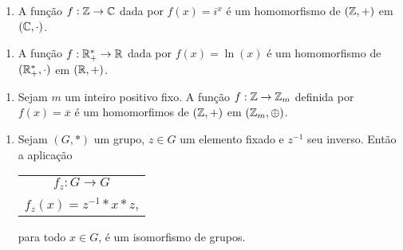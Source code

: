 \documentclass{beamer}
\begin{document}
    \begin{frame}
        \begin{exemplos}
            \begin{enumerate}[label={\arabic*})]
                \item A fun\c{c}\~ao $f : \mathbb{Z} \to \mathbb{C}$ \pause dada por $f(x) = i^x$ \pause \'e um homomorfismo de $(\mathbb{Z}, +)$ \pause em $(\mathbb{C}, \cdot)$.
                \seti
            \end{enumerate}
        \end{exemplos}
    \end{frame}
    \begin{frame}
        \begin{exemplos}
            \begin{enumerate}[label={\arabic*})]
                \conti

                \item A fun\c{c}\~ao $f : \mathbb{R}^*_+ \to \mathbb{R}$ \pause dada por $f(x) = \ln(x)$ \pause \'e um homomorfismo de $(\mathbb{R}^*_+, \cdot)$ \pause em $(\mathbb{R}, +)$.
                \seti
            \end{enumerate}
        \end{exemplos}
    \end{frame}
    \begin{frame}
        \begin{exemplos}
            \begin{enumerate}[label={\arabic*})]
                \conti

                \item Sejam $m$ um inteiro positivo fixo. \pause A fun\c{c}\~ao $f: \mathbb{Z} \to \mathbb{Z}_m$ \pause definida por $f(x) = \overline{x}$ \pause \'e um homomorfimos de $(\mathbb{Z}, +)$ \pause em $(\mathbb{Z}_m, \oplus)$.
                \seti
            \end{enumerate}
        \end{exemplos}
    \end{frame}
    \begin{frame}
        \begin{exemplos}
            \begin{enumerate}[label={\arabic*})]
                \conti

                \item Sejam $(G, *)$ um grupo, \pause $z\in G$ um elemento fixado \pause e $z^{-1}$ seu inverso. \pause Então a aplica{\c c}{\~a}o\pause
                \begin{center}
                    \begin{tabular}{c}
                        $f_z: G\to G$\pause\\
                        $f_z(x) = z^{-1}*x*z$,\pause
                    \end{tabular}
                \end{center}
                 para todo $x \in G$, {\'e} um isomorfismo de grupos.
            \end{enumerate}
        \end{exemplos}
    \end{frame}
\end{document}

